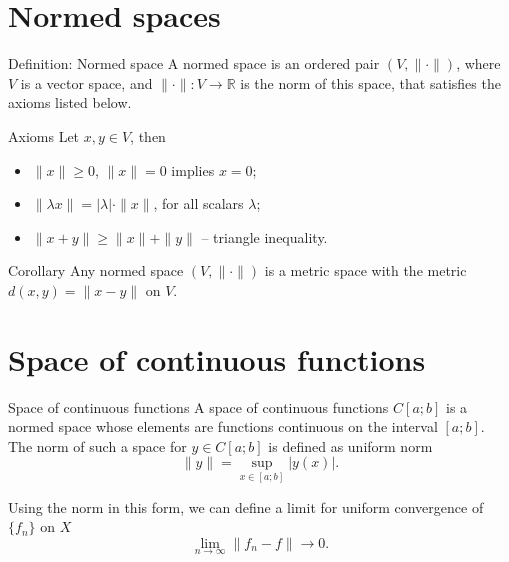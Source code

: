 \documentclass[10pt]{beamer}
\begin{document}
\section{Normed spaces}
\begin{frame}
	\begin{block}{Definition: Normed space}
		A normed space is an ordered pair \((V, \| \cdot \|)\), where \(V\) is a vector space,
		and \(\| \cdot \|:V \rightarrow \mathbb{R}\) is the norm of this space, that satisfies
		the axioms listed below.
	\end{block}

	\begin{alertblock}{Axioms}
		Let \(x, y \in V\), then
		\begin{itemize}
			\item \(\|x\| \ge 0\), \(\|x\| = 0\) implies \(x = 0\);
			\item \(\| \lambda x \| = |\lambda| \cdot \|x\|\), for all scalars \(\lambda\);
			\item \(\|x + y\| \ge \|x\| + \|y\|\) -- triangle inequality.
		\end{itemize}
	\end{alertblock}

	\begin{exampleblock}{Corollary}
		Any normed space \((V, \| \cdot \|)\) is a metric space with the metric
		\(d(x, y) = \| x - y \|\) on \(V\).
	\end{exampleblock}
\end{frame}

\section{Space of continuous functions}
\begin{frame}
	\begin{block}{Space of continuous functions}
		A space of continuous functions \(C[a;b]\) is a normed space whose elements are
		functions continuous on the interval \([a;b]\). The norm of such a space for \(y \in C[a;b]\) is defined as
		uniform norm
		\[\|y\| = \sup_{x \in [a;b]}|y(x)|.\]
	\end{block}
	Using the norm in this form, we can define a limit for uniform convergence of \(\{f_n\}\) on \(X\)
	\[\lim_{n \rightarrow \infty} \|f_n - f\| \rightarrow 0.\]
\end{frame}
\end{document}
